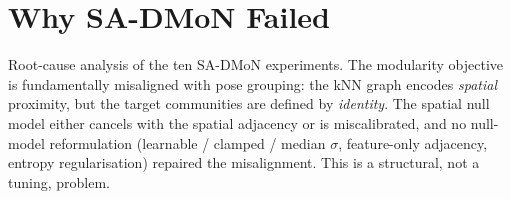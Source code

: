 \section{Why SA-DMoN Failed}
\label{sec_disc_sadmon}

Root-cause analysis of the ten SA-DMoN experiments. The modularity objective is fundamentally misaligned with pose grouping: the kNN graph encodes \emph{spatial} proximity, but the target communities are defined by \emph{identity}. The spatial null model either cancels with the spatial adjacency or is miscalibrated, and no null-model reformulation (learnable / clamped / median $\sigma$, feature-only adjacency, entropy regularisation) repaired the misalignment. This is a structural, not a tuning, problem.
